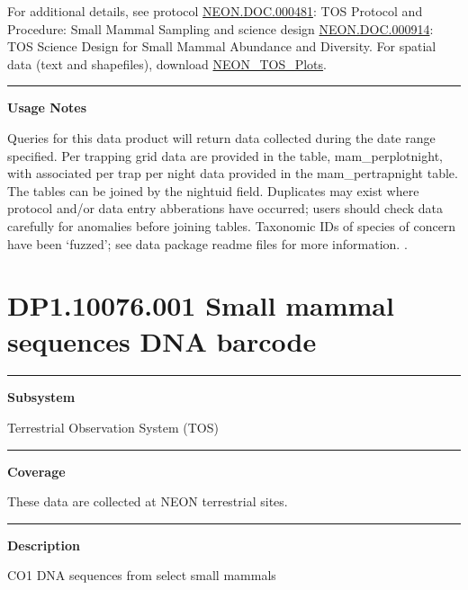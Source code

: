 \documentclass[]{article}
\begin{document}
For additional details, see protocol
\href{http://data.neonscience.org/api/v0/documents/NEON.DOC.000481vJ}{NEON.DOC.000481}:
TOS Protocol and Procedure: Small Mammal Sampling and science design
\href{http://data.neonscience.org/api/v0/documents/NEON.DOC.000915vA}{NEON.DOC.000914}:
TOS Science Design for Small Mammal Abundance and Diversity. For spatial
data (text and shapefiles), download
\href{http://data.neonscience.org/api/v0/documents/NEON_TOS_Plots_V4}{NEON\_TOS\_Plots}.

\begin{center}\rule{0.5\linewidth}{\linethickness}\end{center}

\textbf{Usage Notes}

Queries for this data product will return data collected during the date
range specified. Per trapping grid data are provided in the table,
mam\_perplotnight, with associated per trap per night data provided in
the mam\_pertrapnight table. The tables can be joined by the nightuid
field. Duplicates may exist where protocol and/or data entry abberations
have occurred; users should check data carefully for anomalies before
joining tables. Taxonomic IDs of species of concern have been `fuzzed';
see data package readme files for more information. \newpage
.

\section{DP1.10076.001 Small mammal sequences DNA
barcode}\label{dp1.10076.001-small-mammal-sequences-dna-barcode}

\begin{center}\rule{0.5\linewidth}{\linethickness}\end{center}

\textbf{Subsystem}

Terrestrial Observation System (TOS)

\begin{center}\rule{0.5\linewidth}{\linethickness}\end{center}

\textbf{Coverage}

These data are collected at NEON terrestrial sites.

\begin{center}\rule{0.5\linewidth}{\linethickness}\end{center}

\textbf{Description}

CO1 DNA sequences from select small mammals
\end{document}
